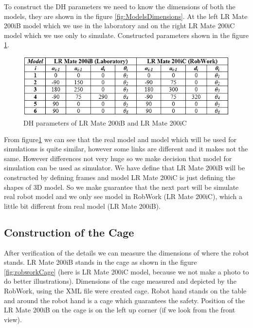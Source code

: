 To construct the DH parameters we need to know the dimensions of both the models, they are shown in the figure \ref{fig:ModelsDimensions}. At the left LR Mate 200iB model which we use in the laboratory and on the right LR Mate 200iC model which we use only to simulate. Constructed parameters shown in the figure \ref{fig:tableParameters}. 

\begin{figure}[H]
  \centering
  \includegraphics[scale= 0.8]{source/table2.png}
  \caption{DH parameters of LR Mate 200iB and LR Mate 200iC}
  \label{fig:tableParameters}
\end{figure}

From figure\ref{fig:tableParameters} we can see that the real model and model which will be used for simulations is quite similar, however some links are different and it makes not the same. However differences not very huge so we make decision that model for simulation can be used as simulator. We have define that LR Mate 200iB will be constructed by defining frames and model LR Mate 200iC is just defining the shapes of 3D model. So we make guarantee that the next part will be simulate real robot model and we only see model in RobWork (LR Mate 200iC), which a little bit different from real model (LR Mate 200iB).

\subsection{Construction of the Cage}
After verification of the details we can measure the dimensions of where the robot stands. LR Mate 200iB stands in the cage as shown in the figure \ref{fig:robworkCage} (here is LR Mate 200iC model, because we not make a photo to do better illustrations). Dimensions of the cage measured and depicted by the RobWork, using the XML file were created cage. Robot hand stands on the table and around the robot hand is a cage which guarantees the safety. Position of the LR Mate 200iB on the cage is on the left up corner (if we look from the front view).

